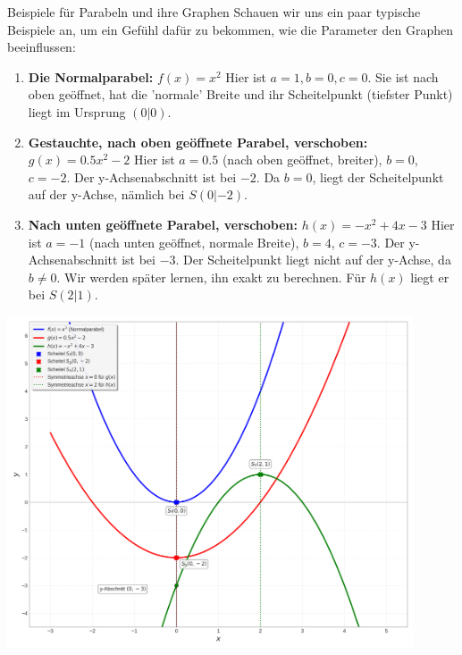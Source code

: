 \begin{beispielumgebung}{Beispiele für Parabeln und ihre Graphen}
Schauen wir uns ein paar typische Beispiele an, um ein Gefühl dafür zu bekommen, wie die Parameter den Graphen beeinflussen:

\begin{enumerate}
    \item \textbf{Die Normalparabel:} $f(x) = x^2$
        Hier ist $a=1, b=0, c=0$. Sie ist nach oben geöffnet, hat die 'normale' Breite und ihr Scheitelpunkt (tiefster Punkt) liegt im Ursprung $(0|0)$.
    \item \textbf{Gestauchte, nach oben geöffnete Parabel, verschoben:} $g(x) = 0.5x^2 - 2$
        Hier ist $a=0.5$ (nach oben geöffnet, breiter), $b=0$, $c=-2$. Der y-Achsenabschnitt ist bei $-2$. Da $b=0$, liegt der Scheitelpunkt auf der y-Achse, nämlich bei $S(0|-2)$.
    \item \textbf{Nach unten geöffnete Parabel, verschoben:} $h(x) = -x^2 + 4x - 3$
        Hier ist $a=-1$ (nach unten geöffnet, normale Breite), $b=4$, $c=-3$. Der y-Achsenabschnitt ist bei $-3$. Der Scheitelpunkt liegt nicht auf der y-Achse, da $b \neq 0$. Wir werden später lernen, ihn exakt zu berechnen. Für $h(x)$ liegt er bei $S(2|1)$.
\end{enumerate}
\end{beispielumgebung}

\begin{center}
    \includegraphics[width=0.9\textwidth]{grafiken/Quadratische_Funktionen_Beispiele.png}
    \label{fig:parabel_beispiele}
\end{center}


